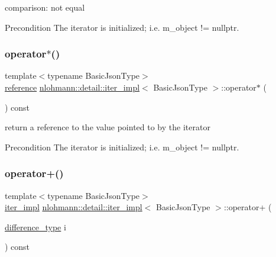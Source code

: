 comparison\+: not equal 

\begin{DoxyPrecond}{Precondition}
The iterator is initialized; i.\+e. {\ttfamily m\+\_\+object != nullptr}. 
\end{DoxyPrecond}
\mbox{\label{classnlohmann_1_1detail_1_1iter__impl_a5ca57856d9bba54a5fc51cee891de827}} 
\subsubsection{\texorpdfstring{operator$\ast$()}{operator*()}}
{\footnotesize\ttfamily template$<$typename Basic\+Json\+Type$>$ \\
\mbox{\hyperlink{classnlohmann_1_1detail_1_1iter__impl_a5be8001be099c6b82310f4d387b953ce}{reference}} \mbox{\hyperlink{classnlohmann_1_1detail_1_1iter__impl}{nlohmann\+::detail\+::iter\+\_\+impl}}$<$ Basic\+Json\+Type $>$\+::operator$\ast$ (\begin{DoxyParamCaption}{ }\end{DoxyParamCaption}) const\hspace{0.3cm}{\ttfamily [inline]}}



return a reference to the value pointed to by the iterator 

\begin{DoxyPrecond}{Precondition}
The iterator is initialized; i.\+e. {\ttfamily m\+\_\+object != nullptr}. 
\end{DoxyPrecond}
\mbox{\label{classnlohmann_1_1detail_1_1iter__impl_a8ef76aeb5a5032768f0f61f48ac189c0}} 
\subsubsection{\texorpdfstring{operator+()}{operator+()}}
{\footnotesize\ttfamily template$<$typename Basic\+Json\+Type$>$ \\
\mbox{\hyperlink{classnlohmann_1_1detail_1_1iter__impl}{iter\+\_\+impl}} \mbox{\hyperlink{classnlohmann_1_1detail_1_1iter__impl}{nlohmann\+::detail\+::iter\+\_\+impl}}$<$ Basic\+Json\+Type $>$\+::operator+ (\begin{DoxyParamCaption}\item[{\mbox{\hyperlink{classnlohmann_1_1detail_1_1iter__impl_a2f7ea9f7022850809c60fc3263775840}{difference\+\_\+type}}}]{i }\end{DoxyParamCaption}) const\hspace{0.3cm}{\ttfamily [inline]}}



